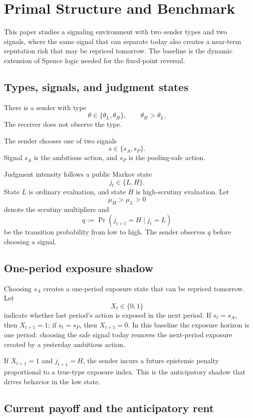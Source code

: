 
\section{Primal Structure and Benchmark}
\label{sec:model}

This paper studies a signaling environment with two sender types and two signals, where the same signal that can separate today also creates a near-term reputation risk that may be repriced tomorrow. The baseline is the dynamic extension of Spence logic needed for the fixed-point reversal.

\subsection{Types, signals, and judgment states}

There is a sender with type
\[
\theta\in\{\theta_L,\theta_H\},\qquad \theta_H>\theta_L.
\]
The receiver does not observe the type.

The sender chooses one of two signals
\[
s\in\{s_A,s_P\}.
\]
Signal $s_A$ is the ambitious action, and $s_P$ is the pooling-safe action.

Judgment intensity follows a public Markov state
\[
j_t\in\{L,H\}.
\]
State $L$ is ordinary evaluation, and state $H$ is high-scrutiny evaluation. Let
\[
\mu_H>\mu_L>0
\]
denote the scrutiny multipliers and
\[
q:=\Pr(j_{t+1}=H\mid j_t=L)
\]
be the transition probability from low to high. The sender observes $q$ before choosing a signal.

\subsection{One-period exposure shadow}

Choosing $s_A$ creates a one-period exposure state that can be repriced tomorrow. Let
\[
X_t\in\{0,1\}
\]
indicate whether last period's action is exposed in the next period. If $s_t=s_A$, then $X_{t+1}=1$; if $s_t=s_P$, then $X_{t+1}=0$. In this baseline the exposure horizon is one period: choosing the safe signal today removes the next-period exposure created by a yesterday ambitious action.

If $X_{t+1}=1$ and $j_{t+1}=H$, the sender incurs a future epistemic penalty proportional to a true-type exposure index. This is the anticipatory shadow that drives behavior in the low state.

\subsection{Current payoff and the anticipatory rent}

